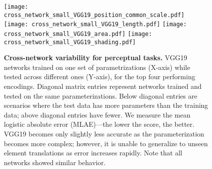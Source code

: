 \begin{figure}[tbhp]
	\centering
	  \texttt{[image: cross\_network\_small\_VGG19\_position\_common\_scale.pdf]}
	  \texttt{[image: cross\_network\_small\_VGG19\_length.pdf]}
	  \texttt{[image: cross\_network\_small\_VGG19\_area.pdf]}
	  \texttt{[image: cross\_network\_small\_VGG19\_shading.pdf]}
	  \vspace{.1cm}
  \caption{\textbf{Cross-network variability for perceptual tasks.} VGG19 networks trained on one set of parametrizations (X-axis) while tested across different ones (Y-axis), for the top four performing encodings. Diagonal matrix entries represent networks trained and tested on the same parameterizations. Below diagonal entries are scenarios where the test data has more parameters than the training data; above diagonal entries have fewer. We measure the mean logistic absolute error (MLAE)---the lower the score, the better. VGG19 becomes only slightly less accurate as the parameterization becomes more complex; however, it is unable to generalize to unseen element translations as error increases rapidly. Note that all networks showed similar behavior.}
	\label{fig:cross_network}
\end{figure}

